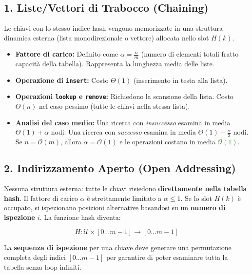 \documentclass[12pt, a4paper]{article}
\begin{document}
\subsection{1. Liste/Vettori di Trabocco (Chaining)}
Le chiavi con lo stesso indice hash vengono memorizzate in una struttura dinamica esterna (lista monodirezionale o vettore) allocata nello slot $H(k)$.
\begin{itemize}
\item \textbf{Fattore di carico:} Definito come $\alpha = \frac{n}{m}$ (numero di elementi totali fratto capacità della tabella). Rappresenta la lunghezza media delle liste.
\item \textbf{Operazione di \texttt{insert}:} Costo $\Theta(1)$ (inserimento in testa alla lista).
\item \textbf{Operazioni \texttt{lookup} e \texttt{remove}:} Richiedono la scansione della lista. Costo $\Theta(n)$ nel caso pessimo (tutte le chiavi nella stessa lista).
\item \textbf{Analisi del caso medio:} Una ricerca con \textit{insuccesso} esamina in media $\Theta(1) + \alpha$ nodi. Una ricerca con \textit{successo} esamina in media $\Theta(1) + \frac{\alpha}{2}$ nodi. Se $n = \mathcal{O}(m)$, allora $\alpha = \mathcal{O}(1)$ e le operazioni costano in media \textcolor{green}{$\mathcal{O}(1)$}.
\end{itemize}

\subsection{2. Indirizzamento Aperto (Open Addressing)}
Nessuna struttura esterna: tutte le chiavi risiedono \textbf{direttamente nella tabella hash}. Il fattore di carico $\alpha$ è strettamente limitato a $\alpha \le 1$.
Se lo slot $H(k)$ è occupato, si ispezionano posizioni alternative basandosi su un \textbf{numero di ispezione $i$}.
La funzione hash diventa:


$$H: \mathcal{U} \times [0 \dots m-1] \rightarrow [0 \dots m-1]$$


La \textbf{sequenza di ispezione} per una chiave deve generare una permutazione completa degli indici $[0 \dots m-1]$ per garantire di poter esaminare tutta la tabella senza loop infiniti.
\end{document}
